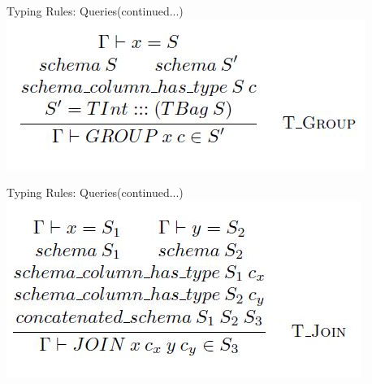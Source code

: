 \begin{frame}{Typing Rules: Queries(continued...)}
\centering
\includegraphics[scale=0.4]{Images/TypingRules/Group.JPG} 
\end{frame}

\begin{frame}{Typing Rules: Queries(continued...)}
\centering
\includegraphics[scale=0.4]{Images/TypingRules/Join.JPG} 
\end{frame}

